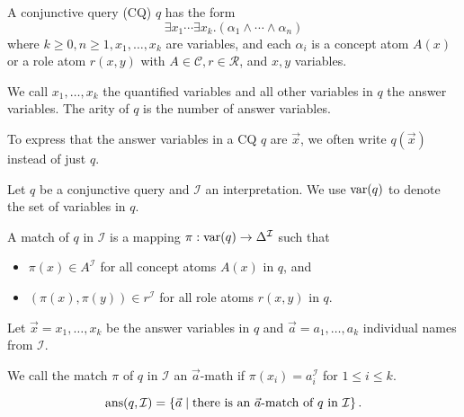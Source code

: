 \begin{definition}
	A conjunctive query (CQ) $q$ has the form
	\[
		\exists x_1 \cdots \exists x_k.(\alpha_1 \land \cdots \land \alpha_n)
	\]
	where $k \geq 0, n \geq 1, x_1, \ldots, x_k$ are variables, and
	each $\alpha_i$ is a concept atom $A(x)$ or a role atom $r(x,y)$ 
	with $A \in \mathscr{C}, r \in \mathscr{R}$, and $x,y$ variables.

	We call $x_1, \ldots, x_k$ the quantified variables and all other variables in $q$ the answer variables.
	The arity of $q$ is the number of answer variables.
	
	To express that the answer variables in a CQ $q$ are $\vec{x}$,
	we often write $q(\vec{x})$ instead of just $q$.
\end{definition}

\begin{definition}
	Let $q$ be a conjunctive query and $\mathcal{I}$ an interpretation.
	We use $\operatorname{\text{var}}(q)$ to denote the set of variables in $q$.

	A match of $q$ in $\mathcal{I}$ is a mapping $\pi: \operatorname{\text{var}}(q) \to \Delta^{\mathcal{I}}$ such that
	\begin{itemize}
		\item $\pi(x) \in A^{\mathcal{I}}$ for all concept atoms $A(x)$ in $q$, and
		\item $\left( \pi(x),\pi(y) \right) \in r^{\mathcal{I}}$ for all role atoms $r(x,y)$ in $q$.
	\end{itemize}
	Let $\vec{x} = x_1, \ldots, x_k$  be the answer variables in $q$ and
	$\vec{a} = a_1, \ldots, a_k$ individual names from $\mathscr{I}$.

	We call the match $\pi$ of $q$ in $\mathcal{I}$ an $\vec{a}$-math if $\pi(x_i) = a_i^{\mathcal{I}}$ for $1 \leq i \leq k$.
\end{definition}

\begin{lemma}
	\[
		\operatorname{\text{ans}}(q, \mathcal{I}) = \left\{ \vec{a} \mid \text{there is an $\vec{a}$-match of $q$ in $\mathcal{I}$} \right\}
	.\]
\end{lemma}
